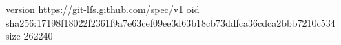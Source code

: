 version https://git-lfs.github.com/spec/v1
oid sha256:17198f18022f2361f9a7e63cef09ee3d63b18cb73ddfca36cdca2bbb7210c534
size 262240
